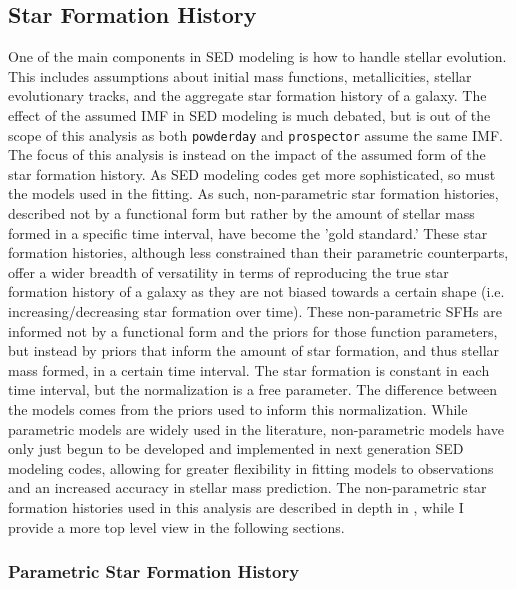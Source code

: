 \documentclass[twocolumn]{aastex62}
\begin{document}
\subsection{Star Formation History}

One of the main components in SED modeling is how to handle stellar evolution. This includes assumptions about initial mass functions, metallicities, stellar evolutionary tracks, and the aggregate star formation history of a galaxy. The effect of the assumed IMF in SED modeling is much debated, but is out of the scope of this analysis as both \texttt{powderday} and \texttt{prospector} assume the same IMF. The focus of this analysis is instead on the impact of the assumed form of the star formation history. As SED modeling codes get more sophisticated, so must the models used in the fitting. As such, non-parametric star formation histories, described not by a functional form but rather by the amount of stellar mass formed in a specific time interval, have become the 'gold standard.' These star formation histories, although less constrained than their parametric counterparts, offer a wider breadth of versatility in terms of reproducing the true star formation history of a galaxy as they are not biased towards a certain shape (i.e. increasing/decreasing star formation over time).  These non-parametric SFHs are informed not by a functional form and the priors for those function parameters, but instead by priors that inform the amount of star formation, and thus stellar mass formed, in a certain time interval. The star formation is constant in each time interval, but the normalization is a free parameter. The difference between the models comes from the priors used to inform this normalization. While parametric models are widely used in the literature, non-parametric models have only just begun to be developed and implemented in next generation SED modeling codes, allowing for greater flexibility in fitting models to observations and an increased accuracy in stellar mass prediction. The non-parametric star formation histories used in this analysis are described in depth in \citep{leja_how_2018}, while I provide a more top level view in the following sections. 




\subsubsection{Parametric Star Formation History}
\end{document}
